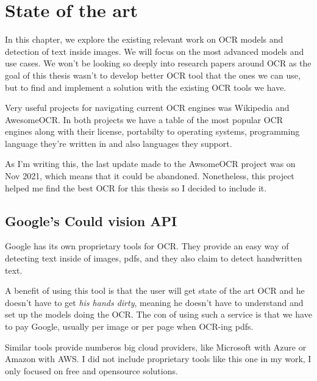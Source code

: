 \documentclass[
  digital,     %
  oneside,     %
  nosansbold,  %
  nocolorbold, %
  nolof,         %
  nolot,         %
]{fithesis4}
\begin{document}

\chapter{State of the art}

In this chapter, we explore the existing relevant work on OCR models and detection of text inside images. We will focus on the most advanced models and use cases. We won't be looking so deeply into research papers around OCR as the goal of this thesis wasn't to develop better OCR tool that the ones we can use, but to find and implement a solution with the existing OCR tools we have.

Very useful projects for navigating current OCR engines was Wikipedia\cite{ocrwikipedia} and AwesomeOCR\cite{awesomeocr}. In both projects we have a table of the most popular OCR engines along with their license, portabilty to operating systems, programming language they're written in and also languages they support.

As I'm writing this, the last update made to the AwsomeOCR project was on Nov 2021, which means that it could be abandoned. Nonetheless, this project helped me find the best OCR for this thesis so I decided to include it.

\section{Google's Could vision API \cite{googleapi}}

Google has its own proprietary tools for OCR. They provide an easy way of detecting text inside of images, pdfs, and they also claim to detect handwritten text.

A benefit of using this tool is that the user will get state of the art OCR and he doesn't have to get \emph{his hands dirty}, meaning he doesn't have to understand and set up the models doing the OCR. The con of using such a service is that we have to pay Google, usually per image or per page when OCR-ing pdfs.

Similar tools provide numberos big cloud providers, like Microsoft with Azure\cite{azurevision} or Amazon with AWS\cite{awstextract}. I did not include proprietary tools like this one in my work, I only focused on free and opensource solutions.
\end{document}
